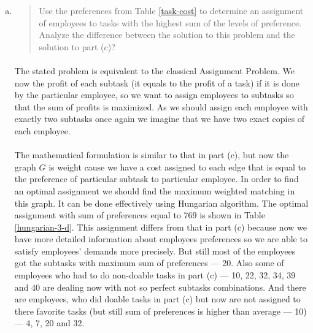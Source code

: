 \begin{enumerate}[(a)]
\item\begin{quote}Use the preferences from Table \ref{task-cost} to determine an assignment of employees to
tasks with the highest sum of the levels of preference. Analyze the difference
between the solution to this problem and the solution to part (c)?\end{quote}

	\paragraph{}
	The stated problem is equivalent to the classical Assignment Problem. We now the profit of each subtask (it equals to the profit of a task) if it is done by the particular employee, so we want to assign employees to subtasks so that the sum of profits is maximized. As we should assign each employee with exactly two subtasks once again we imagine that we have two exact copies of each employee.

	\paragraph{}
	The mathematical formulation is similar to that in part (c), but now the graph $G$ is weight cause we have a cost assigned to each edge that is equal to the preference of particular subtask to particular employee. In order to find an optimal assignment we should find the maximum weighted matching in this graph. It can be done effectively using Hungarian algorithm. The optimal assignment with sum of preferences equal to 769 is shown in Table \ref{hungarian-3-d}. This assignment differs from that in part (c) because now we have more detailed information about employees preferences so we are able to satisfy employees' demands more precisely. But still most of the employees got the subtasks with maximum sum of preferences --- 20. Also some of employees who had to do non-doable tasks in part (c) --- 10, 22, 32, 34, 39 and 40 are dealing now with not so perfect subtasks combinations. And there are employees, who did doable tasks in part (c) but now are not assigned to there favorite tasks (but still sum of preferences is higher than average --- 10) --- 4, 7, 20 and 32.


\end{enumerate}

